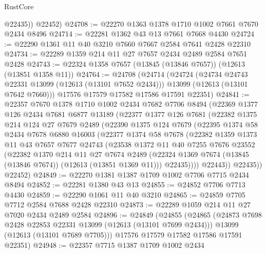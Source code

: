 \begin{lexlean}{RustCore}
\begin{coremodule}
          @22435))
      @22452)
@24708 := @22270 @1363 @1378 @1710 @1002 @7661 @7670 @2434 @8496
@24714 := @22281 @1362 @43 @13 @7661 @7668 @4430
@24724 := @22290 @1361 @11 @40 @3210 @7660 @7667 @2584 @7641 @2428 @22310
@24734 := @22289 @1359 @214 @11 @27 @7657 @2434 @2489 @2584 @7651 @2428
@24743 := @22324 @1358 @7657 (@13845 (@13846 @7657)) (@12613 (@13851 @1358 @11))
@24764 := @24708
    (@24714
      (@24724
        (@24734 @24743 @22331 @13099 (@12613 (@13101 @7652 @2434)))
        @13099
        (@12613 (@13101 @7642 @7660)))
      @17576
      @17579
      @17582
      @17586
      @17591
      @22351)
@24841 := @22357
    @7670
    @1378
    @1710
    @1002
    @2434
    @7682
    @7706
    @8494
    (@22369
      @1377
      @126
      @2434
      @7681
      @6877
      @13189
      (@22377
        @1377
        @126
        @7681
        (@22382
          @1375
          @214
          @124
          @27
          @7679
          @2489
          (@22390
            @1375
            @124
            @7679
            (@22395
              @1374
              @58
              @2434
              @7678
              @6880
              @16003
              (@22377
                @1374
                @58
                @7678
                (@22382
                  @1359
                  @1373
                  @11
                  @43
                  @7657
                  @7677
                  @24743
                  (@23538
                    @1372
                    @11
                    @40
                    @7255
                    @7676
                    @23552
                    (@22382
                      @1370
                      @214
                      @11
                      @27
                      @7674
                      @2489
                      (@22324 @1369 @7674 (@13845 (@13846 @7674)) (@12613 (@13851 @1369 @11)))
                      @22435))))
              @22443))
          @22435))
      @22452)
@24849 := @22270 @1381 @1387 @1709 @1002 @7706 @7715 @2434 @8494
@24852 := @22281 @1380 @43 @13
@24855 := @24852 @7706 @7713 @4430
@24859 := @22290 @1061 @11 @40 @3210
@24865 := @24859 @7705 @7712 @2584 @7688 @2428 @22310
@24873 := @22289 @1059 @214 @11 @27 @7020 @2434 @2489 @2584
@24896 := @24849
    (@24855
      (@24865
        (@24873 @7698 @2428 @22853 @22331 @13099 (@12613 (@13101 @7699 @2434)))
        @13099
        (@12613 (@13101 @7689 @7705)))
      @17576
      @17579
      @17582
      @17586
      @17591
      @22351)
@24948 := @22357
    @7715
    @1387
    @1709
    @1002
    @2434

\end{coremodule}
\end{lexlean}
